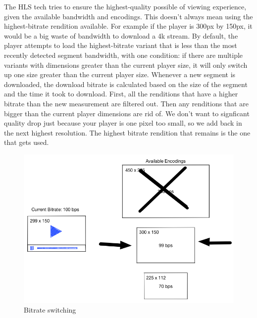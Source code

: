 The HLS tech tries to ensure the highest-quality possible of viewing experience, given the available bandwidth and encodings. This doesn't always mean using the highest-bitrate rendition available. For example if the player is 300px by 150px, it would be a big waste of bandwidth to download a 4k stream. By default, the player attempts to load the highest-bitrate variant that is less than the most recently detected segment bandwidth, with one condition: if there are multiple variants with dimensions greater than the current player size, it will only switch up one size greater than the current player size.
Whenever a new segment is downloaded, the download bitrate is calculated based on the size of the segment and the time it took to download.
First, all the renditions that have a higher bitrate than the new measurement are filtered out.
Then any renditions that are bigger than the current player dimensions are rid of.
We don't want to signficant quality drop just because your player is one pixel too small, so we add back in the next highest resolution. The highest bitrate rendition that remains is the one that gets used.\cite{videojs_asb}


\begin{figure}[htb] %
 \centering
 \includegraphics[width=0.8\linewidth]{images/chapter2/bitrate-switching-4.png}\hfill
 \caption[Bitrate switching]{Bitrate switching}
 \label{fig:fourV}
\end{figure}



\newpage